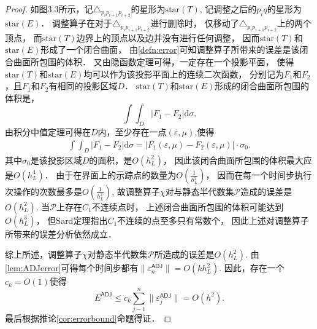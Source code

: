\begin{proof}
	如图3.3所示，记$\triangle_{p_i p_{i+1} p_{i+2}}$的星形为$\mathrm{star}(T)$,
	记调整之后的$\overline{p_i q}$的星形为$\mathrm{star}(E)$．
	调整算子在对于$\triangle_{p_i p_{i+1} p_{i+2}}$进行删除时，
	仅移动了$\triangle_{p_i p_{i+1} p_{i+2}}$上的两个顶点，
	而$\mathrm{star}(T)$边界上的顶点以及边并没有进行任何调整，
	因而$\mathrm{star}(T)$和$\mathrm{star}(E)$形成了一个闭合曲面，
	由\eqref{defn:error}可知调整算子所带来的误差是该闭合曲面所包围的体积．
	又由隐函数定理可得，一定存在一个投影平面，
	使得$\mathrm{star}(T)$和$\mathrm{star}(E)$均可以作为该投影平面上的连续二次函数，
	分别记为$F_1$和$F_2$，且$F_1$和$F_2$有相同的投影区域$D$．
	$\mathrm{star}(T)$和$\mathrm{star}(E)$形成的闭合曲面所包围的体积是，
	\begin{equation*}
	\int\int_{D}|F_1-F_2|\mathrm{d}\sigma.
	\end{equation*}
	由积分中值定理可得在$D$内，至少存在一点$(\varepsilon,\mu)$,使得
	\begin{eqnarray}
	\int\int_{D}|F_1-F_2|\mathrm{d}\sigma=|F_1(\varepsilon,\mu)-F_2(\varepsilon,\mu)|\cdot\sigma_0.
	\end{eqnarray}
	其中$\sigma_0$是该投影区域$D$的面积，是$O(h_L^2)$，
	因此该闭合曲面所包围的体积最大应是$O(h_L^4)$．
	由于在界面上的示踪点的数量为$O(\frac{1}{h_L^2})$，
	因而在每一个时间步执行次操作的次数最多是$O(\frac{1}{h_L^2})$,
	故调整算子$\chi$对与静态半代数集$\mathcal{P}$造成的误差是$O(h_L^2)$.
	当$\mathcal{P}$上存在$C_1$不连续点时，
	上述闭合曲面所包围的体积可能达到$O(h_L^3)$，
	但Sard定理指出$C_1$不连续的点至多只有常数个，
	因此上述对调整算子所带来的误差分析依然成立．
	
	
	综上所述，调整算子$\chi$对静态半代数集$\mathcal{P}$所造成的误差是$O(h_L^2)$. 
	由\eqref{lem:ADJerror}可得每个时间步都有$\|\varepsilon_n^{\textsf{ADJ}}\|=O(kh_L^2)$.
	因此，存在一个$c_k=O(1)$使得
	\begin{equation}
	E^{\textsf{ADJ}}\leq c_k\sum_{j-1}^n\|\varepsilon_j^{\textsf{ADJ}}\|=O(h^2).
	\end{equation}
	最后根据推论\eqref{cor:errorbound}命题得证．
\end{proof}